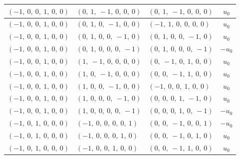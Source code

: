 \documentclass[11pt]{article}
\theoremstyle{definition}
\begin{document}
\begin{longtable}{|l|l|l|c|}
    \hline
    $\left( -1, \  0, \  0, \  1, \  0, \  0\right)$ & $\left( 0, \  1, \  -1, \  0, \  0, \  0\right)$ & $\left( 0, \  1, \  -1, \  0, \  0, \  0\right)$ & $u_{0}$ \\
    \hline
    $\left( -1, \  0, \  0, \  1, \  0, \  0\right)$ & $\left( 0, \  1, \  0, \  -1, \  0, \  0\right)$ & $\left( -1, \  1, \  0, \  0, \  0, \  0\right)$ & $u_{0}$ \\
    \hline
    $\left( -1, \  0, \  0, \  1, \  0, \  0\right)$ & $\left( 0, \  1, \  0, \  0, \  -1, \  0\right)$ & $\left( 0, \  1, \  0, \  0, \  -1, \  0\right)$ & $u_{0}$ \\
    \hline
    $\left( -1, \  0, \  0, \  1, \  0, \  0\right)$ & $\left( 0, \  1, \  0, \  0, \  0, \  -1\right)$ & $\left( 0, \  1, \  0, \  0, \  0, \  -1\right)$ & $- u_{0}$ \\
    \hline
    $\left( -1, \  0, \  0, \  1, \  0, \  0\right)$ & $\left( 1, \  -1, \  0, \  0, \  0, \  0\right)$ & $\left( 0, \  -1, \  0, \  1, \  0, \  0\right)$ & $u_{0}$ \\
    \hline
    $\left( -1, \  0, \  0, \  1, \  0, \  0\right)$ & $\left( 1, \  0, \  -1, \  0, \  0, \  0\right)$ & $\left( 0, \  0, \  -1, \  1, \  0, \  0\right)$ & $u_{0}$ \\
    \hline
    $\left( -1, \  0, \  0, \  1, \  0, \  0\right)$ & $\left( 1, \  0, \  0, \  -1, \  0, \  0\right)$ & $\left( -1, \  0, \  0, \  1, \  0, \  0\right)$ & $u_{0}$ \\
    \hline
    $\left( -1, \  0, \  0, \  1, \  0, \  0\right)$ & $\left( 1, \  0, \  0, \  0, \  -1, \  0\right)$ & $\left( 0, \  0, \  0, \  1, \  -1, \  0\right)$ & $u_{0}$ \\
    \hline
    $\left( -1, \  0, \  0, \  1, \  0, \  0\right)$ & $\left( 1, \  0, \  0, \  0, \  0, \  -1\right)$ & $\left( 0, \  0, \  0, \  1, \  0, \  -1\right)$ & $- u_{0}$ \\
    \hline
    $\left( -1, \  0, \  1, \  0, \  0, \  0\right)$ & $\left( -1, \  0, \  0, \  0, \  0, \  1\right)$ & $\left( 0, \  0, \  -1, \  0, \  0, \  1\right)$ & $- u_{0}$ \\
    \hline
    $\left( -1, \  0, \  1, \  0, \  0, \  0\right)$ & $\left( -1, \  0, \  0, \  0, \  1, \  0\right)$ & $\left( 0, \  0, \  -1, \  0, \  1, \  0\right)$ & $u_{0}$ \\
    \hline
    $\left( -1, \  0, \  1, \  0, \  0, \  0\right)$ & $\left( -1, \  0, \  0, \  1, \  0, \  0\right)$ & $\left( 0, \  0, \  -1, \  1, \  0, \  0\right)$ & $u_{0}$ \\

\end{longtable}
\end{document}
